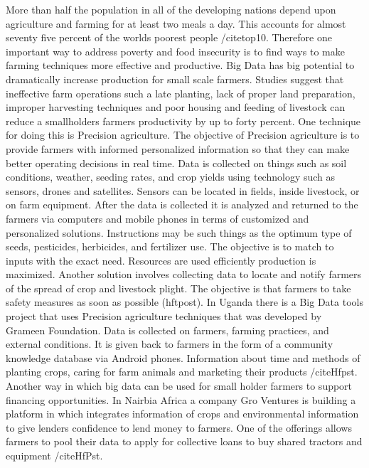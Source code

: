 \documentclass[sigconf]{acmart}
\begin{document}
{More than half the population in all of the developing nations depend upon agriculture and farming for at least two meals a day. This accounts for almost seventy five percent of the worlds poorest people /cite{top10}. Therefore one important way to address poverty and food insecurity is to find ways to make farming techniques more effective and productive. Big Data has big potential to dramatically increase production for small scale farmers. 
Studies suggest that ineffective farm operations such a late planting, lack of proper land preparation, improper harvesting techniques and poor housing and feeding of livestock can reduce a smallholders farmers productivity by up to forty percent. 
One technique for doing this is Precision agriculture. The objective of Precision agriculture is to provide farmers with informed personalized information so that they can make better operating decisions in real time. Data is collected on things such as soil conditions, weather, seeding rates, and crop yields using technology such as sensors, drones and satellites. Sensors can be located in fields, inside livestock, or on farm equipment.  After the data is collected it is analyzed and returned to the farmers via computers and mobile phones in terms of customized and personalized solutions. Instructions may be such things as the optimum type of seeds, pesticides, herbicides, and fertilizer use. The objective is to match to inputs with the exact need. Resources are used efficiently production is maximized. Another solution involves collecting data to locate and notify farmers of the spread of crop and livestock plight. The objective is that farmers to take safety measures as soon as possible (hftpost).
In Uganda there is a Big Data tools project that uses Precision agriculture techniques that was developed by Grameen Foundation. Data is collected on farmers, farming practices, and external conditions. It is given back to farmers in the form of a community knowledge database via Android phones. Information about time and methods of planting crops, caring for farm animals and marketing their products /cite{Hfpst}.
Another way in which big data can be used for small holder farmers to support financing opportunities. In Nairbia Africa a company Gro Ventures is building a platform in which integrates information of crops and environmental information to give lenders confidence to lend money to farmers. One of the offerings allows farmers to pool their data to apply for collective loans to buy shared tractors and equipment /cite{HfPst}.   

}
\end{document}
